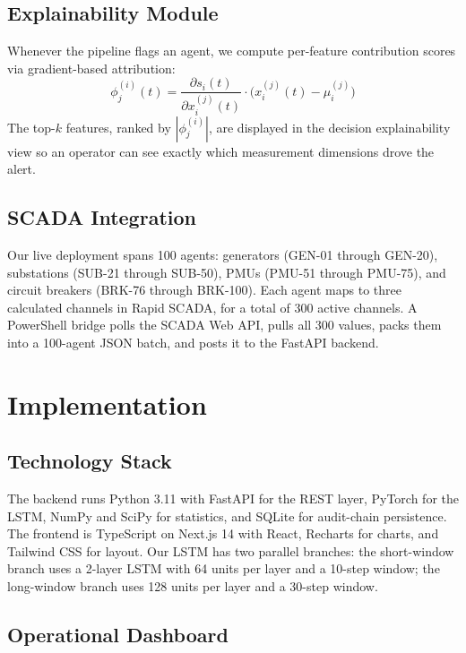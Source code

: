 \documentclass[conference]{IEEEtran}
\begin{document}
\subsection{Explainability Module}

Whenever the pipeline flags an agent, we compute per-feature contribution scores via gradient-based attribution:
\begin{equation}
\phi_j^{(i)}(t) = \frac{\partial s_i(t)}{\partial x_i^{(j)}(t)} \cdot \bigl(x_i^{(j)}(t) - \mu_i^{(j)}\bigr)
\label{eq:explain}
\end{equation}
The top-$k$ features, ranked by $|\phi_j^{(i)}|$, are displayed in the decision explainability view so an operator can see exactly which measurement dimensions drove the alert.

\subsection{SCADA Integration}

Our live deployment spans 100 agents: generators (GEN-01 through GEN-20), substations (SUB-21 through SUB-50), PMUs (PMU-51 through PMU-75), and circuit breakers (BRK-76 through BRK-100). Each agent maps to three calculated channels in Rapid SCADA, for a total of 300 active channels. A PowerShell bridge polls the SCADA Web API, pulls all 300 values, packs them into a 100-agent JSON batch, and posts it to the FastAPI backend.

\section{Implementation}

\subsection{Technology Stack}

The backend runs Python 3.11 with FastAPI for the REST layer, PyTorch for the LSTM, NumPy and SciPy for statistics, and SQLite for audit-chain persistence. The frontend is TypeScript on Next.js 14 with React, Recharts for charts, and Tailwind CSS for layout. Our LSTM has two parallel branches: the short-window branch uses a 2-layer LSTM with 64 units per layer and a 10-step window; the long-window branch uses 128 units per layer and a 30-step window.

\subsection{Operational Dashboard}
\end{document}
